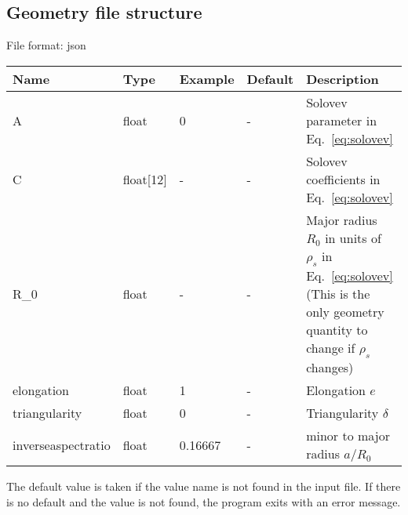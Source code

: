 \subsection{Geometry file structure} \label{sec:geometry_file}
File format: json

\begin{longtable}{llll>{\RaggedRight}p{7cm}}
\toprule
\rowcolor{gray!50}\textbf{Name} &  \textbf{Type} & \textbf{Example} & \textbf{Default} & \textbf{Description}  \\ \midrule
    A      & float & 0 &  - & Solovev parameter in Eq.~\eqref{eq:solovev} \\
    C      & float[12] &  - & - & Solovev coefficients in Eq.~\eqref{eq:solovev}  \\
    R\_0   & float & - & -  & Major radius $R_0$ in units of $\rho_s$ in Eq.~\eqref{eq:solovev} (This is the only geometry quantity to change if $\rho_s$ changes)\\
    elongation    & float & 1 & - & Elongation $e$ \\
    triangularity & float & 0 & - & Triangularity $\delta$ \\
    inverseaspectratio & float & 0.16667 & - & minor to major radius $a/R_0$ \\
\bottomrule
\end{longtable}
The default value is taken if the value name is not found in the input file. If there is no default and
the value is not found,
the program exits with an error message.

